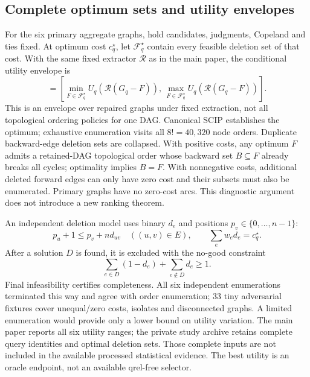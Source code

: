 \documentclass[pdflatex,sn-basic,Numbered]{sn-jnl}
\begin{document}
\subsection{Complete optimum sets and utility envelopes}
For the six primary aggregate graphs, hold candidates, judgments, Copeland and ties fixed. At optimum cost $c_q^\star$, let $\mathcal F_q^\star$ contain every feasible deletion set of that cost. With the same fixed extractor $\mathcal R$ as in the main paper, the conditional utility envelope is
\begin{equation}
[U_q^-,U_q^+]=\left[\min_{F\in\mathcal F_q^\star}U_q(\mathcal R(G_q-F)),\,
\max_{F\in\mathcal F_q^\star}U_q(\mathcal R(G_q-F))\right].
\label{eq:si-envelope}
\end{equation}
This is an envelope over repaired graphs under fixed extraction, not all topological ordering policies for one DAG. Canonical SCIP establishes the optimum; exhaustive enumeration visits all $8!=40,320$ node orders. Duplicate backward-edge deletion sets are collapsed. With positive costs, any optimum $F$ admits a retained-DAG topological order whose backward set $B\subseteq F$ already breaks all cycles; optimality implies $B=F$. With nonnegative costs, additional deleted forward edges can only have zero cost and their subsets must also be enumerated. Primary graphs have no zero-cost arcs. This diagnostic argument does not introduce a new ranking theorem.

An independent deletion model uses binary $d_e$ and positions $p_v\in\{0,\ldots,n-1\}$:
\begin{equation}
p_u+1\le p_v+n d_{uv}\quad((u,v)\in E),\qquad\sum_e w_e d_e=c_q^\star.
\label{eq:si-deletion-mip}
\end{equation}
After a solution $D$ is found, it is excluded with the no-good constraint
\begin{equation}
\sum_{e\in D}(1-d_e)+\sum_{e\notin D}d_e\ge1.
\label{eq:si-nogood}
\end{equation}
Final infeasibility certifies completeness. All six independent enumerations terminated this way and agree with order enumeration; 33 tiny adversarial fixtures cover unequal/zero costs, isolates and disconnected graphs. A limited enumeration would provide only a lower bound on utility variation. The main paper reports all six utility ranges; the private study archive retains complete query identities and optimal deletion sets. Those complete inputs are not included in the available processed statistical evidence. The best utility is an oracle endpoint, not an available qrel-free selector.
\end{document}
